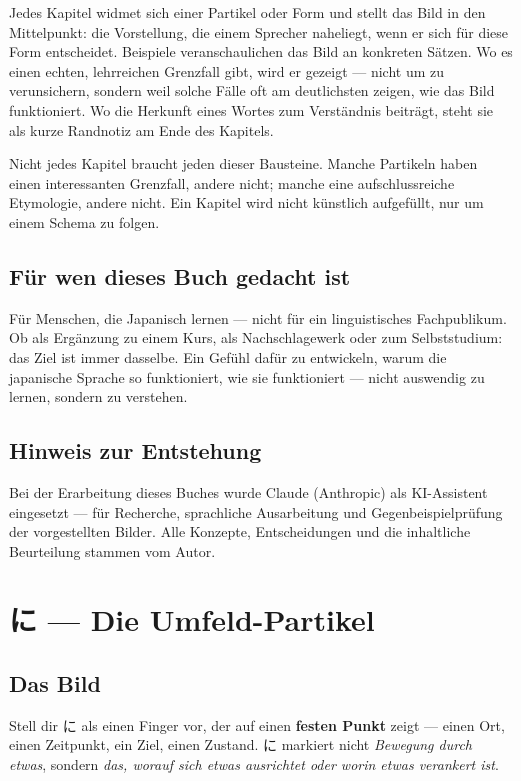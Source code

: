 \documentclass[12pt]{book}
\begin{document}
Jedes Kapitel widmet sich einer Partikel oder Form und stellt das Bild in den Mittelpunkt: die Vorstellung, die einem Sprecher naheliegt, wenn er sich für diese Form entscheidet. Beispiele veranschaulichen das Bild an konkreten Sätzen. Wo es einen echten, lehrreichen Grenzfall gibt, wird er gezeigt — nicht um zu verunsichern, sondern weil solche Fälle oft am deutlichsten zeigen, wie das Bild funktioniert. Wo die Herkunft eines Wortes zum Verständnis beiträgt, steht sie als kurze Randnotiz am Ende des Kapitels.

Nicht jedes Kapitel braucht jeden dieser Bausteine. Manche Partikeln haben einen interessanten Grenzfall, andere nicht; manche eine aufschlussreiche Etymologie, andere nicht. Ein Kapitel wird nicht künstlich aufgefüllt, nur um einem Schema zu folgen.

\section*{Für wen dieses Buch gedacht ist}

Für Menschen, die Japanisch lernen — nicht für ein linguistisches Fachpublikum. Ob als Ergänzung zu einem Kurs, als Nachschlagewerk oder zum Selbststudium: das Ziel ist immer dasselbe. Ein Gefühl dafür zu entwickeln, warum die japanische Sprache so funktioniert, wie sie funktioniert — nicht auswendig zu lernen, sondern zu verstehen.

\section*{Hinweis zur Entstehung}

Bei der Erarbeitung dieses Buches wurde Claude (Anthropic) als KI-Assistent eingesetzt — für Recherche, sprachliche Ausarbeitung und Gegenbeispielprüfung der vorgestellten Bilder. Alle Konzepte, Entscheidungen und die inhaltliche Beurteilung stammen vom Autor.


\chapter{に — Die Umfeld-Partikel}

\section*{Das Bild}

Stell dir に als einen Finger vor, der auf einen \textbf{festen Punkt} zeigt — einen Ort, einen Zeitpunkt, ein Ziel, einen Zustand. に markiert nicht \emph{Bewegung durch etwas}, sondern \emph{das, worauf sich etwas ausrichtet oder worin etwas verankert ist}.
\end{document}
